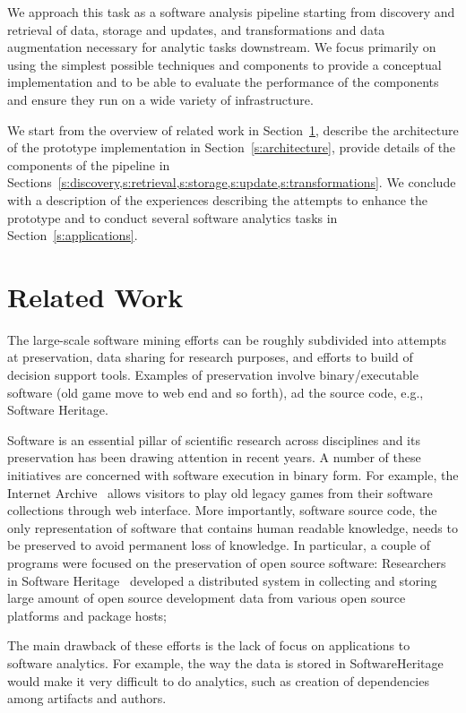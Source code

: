 \documentclass[conference]{IEEEtran}
\begin{document}
We approach this task as a software analysis pipeline starting from discovery and retrieval of data, storage and updates, and transformations and data augmentation necessary for analytic tasks downstream. We focus primarily on using the simplest possible techniques and components to provide a conceptual implementation and to be able to evaluate the performance of the components and ensure they run on a wide variety of infrastructure.

We start from the overview of related work in Section~\ref{s:related}, describe the architecture of the prototype implementation in Section~\ref{s:architecture}, provide details of the components of the pipeline in Sections~\ref{s:discovery,s:retrieval,s:storage,s:update,s:transformations}. We conclude with a description of the experiences describing the attempts to enhance the prototype and to conduct several software analytics tasks in Section~\ref{s:applications}.

\section{Related Work}\label{s:related}

The large-scale software mining efforts can be roughly subdivided into 
attempts at preservation, data sharing for research purposes, and efforts to build of decision support tools.
Examples of preservation 
involve binary/executable software (old game move to web end and so forth), ad the source code, e.g., 
 Software Heritage. 

Software is an essential pillar of scientific research across disciplines and its preservation has been drawing attention in recent years. A number of these initiatives are concerned with software execution in binary form. For example, the Internet Archive~\cite{lueck2014internet} allows visitors to play old legacy games from their software collections through web interface. More importantly, software source code, the only representation of software that contains human readable knowledge, needs to be preserved to avoid permanent loss of knowledge. In particular, a couple of programs were focused on the preservation of open source software: Researchers in Software Heritage~\cite{di2017software} developed a distributed system in collecting and storing large amount of open source development data from various open source platforms and package hosts; 

The main drawback of these efforts is the lack of focus on applications to software analytics. For example, the way the data is stored in SoftwareHeritage would make it very difficult to do analytics, such as 
creation of dependencies among artifacts and authors. 
\end{document}

